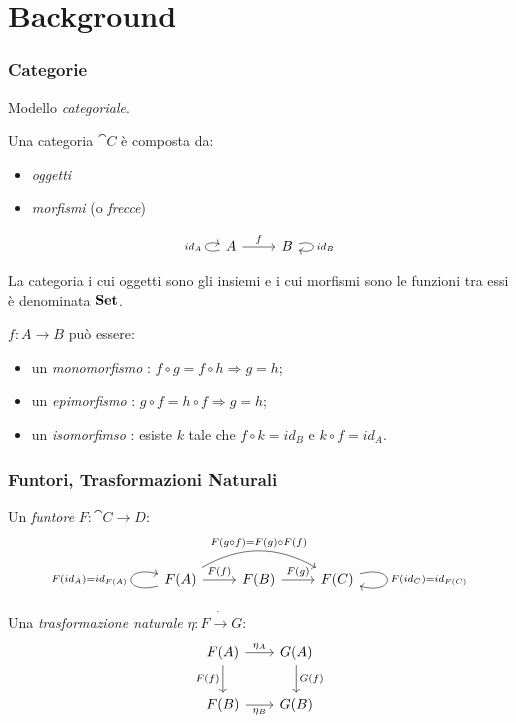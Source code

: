 \documentclass[8pt]{beamer}
\begin{document}
\section{Background}
\begin{frame}[fragile]\frametitle{Categorie} %
	Modello \emph{categoriale}.

	\smallskip

        Una categoria $\cat C$ è composta da:
	\begin{itemize}\item\emph{oggetti}\item\emph{morfismi} (o \emph{frecce})\end{itemize}
        \[
                \begin{tikzcd} A \arrow[loop left, "{id_A}"] \arrow[r, "f"] & B \arrow[loop right, "{id_B}"] \end{tikzcd}
        \]

        \smallskip
        
        La categoria i cui oggetti sono gli insiemi e i cui morfismi sono le funzioni tra essi è denominata $\mathbf{Set}$.
        
        \smallskip

        $f: A \to B$ può essere:
        \begin{itemize}
                \item un \emph{monomorfismo} : $f \circ g = f \circ h \Rightarrow g = h$;
                \item un \emph{epimorfismo} : $g \circ f = h \circ f \Rightarrow g = h$;
                \item un \emph{isomorfimso} : esiste $k$ tale che $f \circ k = id_B$ e $k \circ f = id_A$.
        \end{itemize}

\end{frame}

\begin{frame}[fragile]\frametitle{Funtori, Trasformazioni Naturali}
	Un \emph{funtore} $F: \cat{C \to D}$:
        \[\begin{tikzcd} F(A) \arrow[loop left, "{F(id_A) = id_{F(A)}}"] \arrow[r, "F(f)"] 
        \arrow[rr, bend left=30, "{F(g \circ f) = F(g) \circ F(f)}"] & F(B) \arrow[r, "F(g)"] & F(C) 
        \arrow[loop right, "{F(id_C) = id_{F(C)}}"] \end{tikzcd}\]

        Una \emph{trasformazione naturale} $\eta:F \dot\to G$: %
    \[
        \begin{tikzcd}[row sep = 20, column sep = 20]
            F(A) \arrow[d, "F(f)" swap] \arrow[r, "{\eta_A}"] & G(A) \arrow[d, "G(f)"] \\
            F(B) \arrow[r, "{\eta_B}"swap] & G(B)
        \end{tikzcd}
    \]

\end{frame}
\end{document}
